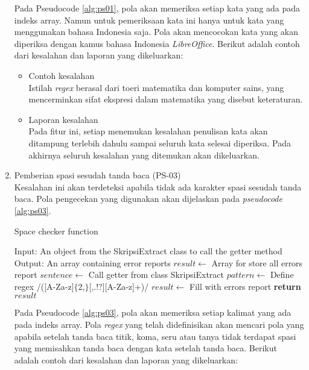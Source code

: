 \begin{enumerate}
	Pada Pseudocode \ref{alg:ps01}, pola akan memeriksa setiap kata yang ada pada indeks array. Namun untuk pemeriksaan kata ini hanya untuk kata yang menggunakan bahasa Indonesia saja. Pola akan mencocokan kata yang akan diperiksa dengan kamus bahasa Indonesia \textit{LibreOffice}. Berikut adalah contoh dari kesalahan dan laporan yang dikeluarkan:
	
	\begin{itemize}
		\item Contoh kesalahan \\
		Istilah \textit{regex} berasal dari toeri matematika dan komputer sains, yang mencerminkan sifat ekspresi dalam matematika yang disebut keteraturan.
		\item Laporan kesalahan \\
		Pada fitur ini, setiap menemukan kesalahan penulisan kata akan ditampung terlebih dahulu sampai seluruh kata selesai diperiksa. Pada akhirnya seluruh kesalahan yang ditemukan akan dikeluarkan.
	\end{itemize}
	
	\item Pemberian spasi sesudah tanda baca (PS-03) \\
	Kesalahan ini akan terdeteksi apabila tidak ada karakter spasi sesudah tanda baca. Pola pengecekan yang digunakan akan dijelaskan pada \textit{pseudocode} \ref{alg:ps03}.
	
\begin{minipage}{1.0\linewidth}
\begin{algorithm}[H]
    \caption{Space checker function}
	\label{alg:ps03}
	\begin{algorithmic}[1]
		\State Input: An object from the SkripsiExtract class to call the getter method
		\State Output: An array containing error reports
		\State
			\State $result \gets$ Array for store all errors report
			\State $sentence \gets$ Call getter from class SkripsiExtract
				\State $pattern \gets$ Define regex /([A-Za-z]$\lbrace$2,$\rbrace$[,.!?][A-Za-z]+)/
                	\State $result \gets$ Fill with errors report
            	\EndIf
        	\EndFor
    		\State \textbf{return} $result$
    	\EndFunction
	\end{algorithmic}
\end{algorithm}
\end{minipage}
\medskip
	
	Pada Pseudocode \ref{alg:ps03}, pola akan memeriksa setiap kalimat yang ada pada indeks array. Pola \textit{regex} yang telah didefinisikan akan mencari pola yang apabila setelah tanda baca titik, koma, seru atau tanya tidak terdapat spasi yang memisahkan tanda baca dengan kata setelah tanda baca. Berikut adalah contoh dari kesalahan dan laporan yang dikeluarkan:
	

\end{enumerate}
